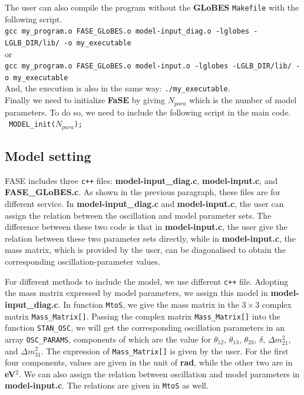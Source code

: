 \documentclass[aps,prd,nofootinbib,preprint]{revtex4}
\begin{document}
The user can also compile the program without the \textbf{GLoBES} \texttt{Makefile} with the following script.\vspace{0.2cm}\\
\texttt{gcc my\_program.o FASE\_GLoBES.o model-input\_diag.o -lglobes -LGLB\_DIR/lib/ -o my\_executable}\\
or\\
\texttt{gcc my\_program.o FASE\_GLoBES.o model-input.o -lglobes -LGLB\_DIR/lib/ -o my\_executable}\vspace{0.2cm}\\
And, the execution is also in the same way: \texttt{./my\_executable}.\\

Finally we need to initialize \textbf{FaSE} by giving $N_{para}$ which is the number of model parameters. To do so, we need to include the following script in the main code.\\
\texttt{    MODEL\_init($N_{para}$); }\vspace{0.2cm}\\ 

\subsection{Model setting}\label{sec:model_set}

FASE includes three \texttt{c++} files: \textbf{model-input\_diag.c}, \textbf{model-input.c}, and \textbf{FASE\_GLoBES.c}. As shown in the previous paragraph, these files are for different service. In \textbf{model-input\_diag.c} and \textbf{model-input.c}, the user can assign the relation between the oscillation and model parameter sets. The difference between these two code is that in \textbf{model-input.c}, the user give the relation between these two parameter sets directly, while in \textbf{model-input.c}, the mass matrix, which is provided by the user, can be diagonalised to obtain the corresponding oscillation-parameter values. 

For different methods to include the model, we use different \texttt{c++} file. Adopting the mass matrix expressed by model parameters, we assign this model in \textbf{model-input\_diag.c}. In function \texttt{MtoS}, we give
the mass matrix in the $3\times3$ complex matrix \texttt{Mass\_Matrix[]}.
%
Passing the complex matrix \texttt{Mass\_Matrix[]} into the function \texttt{STAN\_OSC}, we will get the corresponding oscillation parameters in an array \texttt{OSC\_PARAMS}, components of which are the value for $\theta_{12}$, $\theta_{13}$, $\theta_{23}$, $\delta$, $\Delta m_{21}^2$, and $\Delta m_{31}^2$. The expression of \texttt{Mass\_Matrix[]} is given by the user. For the first four components, values are given in the unit of \textbf{rad}, while the other two are in \textbf{eV$^2$}.  We can also assign the relation between oscillation and model parameters in \textbf{model-input.c}. The relations are given in \texttt{MtoS} as well.
\end{document}
